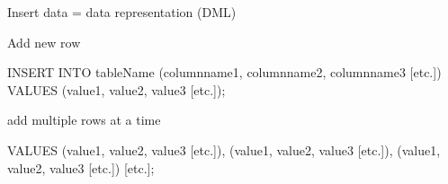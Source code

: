 \begin{frame}[fragile]{Insert data = data representation (DML)}

\begin{block}{Add new row}
  \begin{sqlcode}
INSERT INTO tableName 
       (columnname1, columnname2, columnname3 [etc.]) 
       VALUES (value1, value2, value3 [etc.]);
\end{sqlcode}
\end{block}

\begin{block}{add multiple rows at a time}
  \begin{sqlcode}
VALUES (value1, value2, value3 [etc.]), 
       (value1, value2, value3 [etc.]), 
       (value1, value2, value3 [etc.]) [etc.]; 
\end{sqlcode}
\end{block}

\end{frame}


